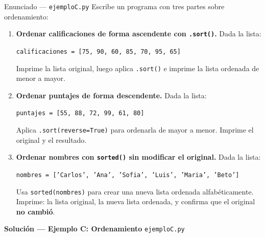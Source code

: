 \documentclass[12pt,a4paper]{article}
\begin{document}
\vspace{0.8em}
\begin{enunciadobox}{Enunciado — \texttt{ejemploC.py}}
Escribe un programa con tres partes sobre ordenamiento:

\begin{enumerate}
  \item \textbf{Ordenar calificaciones de forma ascendente con \texttt{.sort()}.}
        Dada la lista:
        \begin{center}
          \texttt{calificaciones = [75, 90, 60, 85, 70, 95, 65]}
        \end{center}
        Imprime la lista original, luego aplica \texttt{.sort()} e imprime
        la lista ordenada de menor a mayor.

  \item \textbf{Ordenar puntajes de forma descendente.}
        Dada la lista:
        \begin{center}
          \texttt{puntajes = [55, 88, 72, 99, 61, 80]}
        \end{center}
        Aplica \texttt{.sort(reverse=True)} para ordenarla de mayor a menor.
        Imprime el original y el resultado.

  \item \textbf{Ordenar nombres con \texttt{sorted()} sin modificar el original.}
        Dada la lista:
        \begin{center}
          \texttt{nombres = ['Carlos', 'Ana', 'Sofia', 'Luis', 'Maria', 'Beto']}
        \end{center}
        Usa \texttt{sorted(nombres)} para crear una nueva lista ordenada
        alfabéticamente.  Imprime: la lista original, la nueva lista ordenada,
        y confirma que el original \textbf{no cambió}.
\end{enumerate}
\end{enunciadobox}

\newpage
\begin{solucionbanner}
  {\large\bfseries\color{solColor} Solución — Ejemplo C: Ordenamiento}
  \hfill \texttt{ejemploC.py}
\end{solucionbanner}

\vspace{0.8em}

\end{document}
